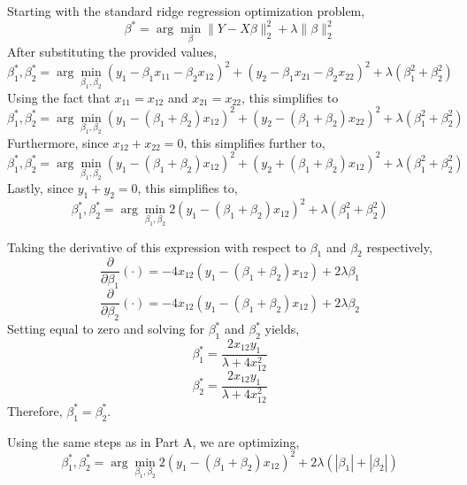 \documentclass[12pt,twoside]{article}
\begin{document}
\begin{problems}
\begin{problemparts}
\end{problemparts}

\newpage

\problem  %

\begin{problemparts}

\problempart %

Starting with the standard ridge regression optimization problem,
$$ \beta^* = \arg\min_{\beta} \lVert Y - X \beta \rVert_2^2 + \lambda \lVert 
\beta \rVert_2^2 $$
After substituting the provided values,
$$ \beta_1^*, \beta_2^* = \arg\min_{\beta_1, \beta_2} \left(y_1 - \beta_1
x_{11} - \beta_2 x_{12}\right)^2 + \left(y_2 - \beta_1 x_{21} - \beta_2
x_{22} \right)^2 + \lambda (\beta_1^2 + \beta_2^2) $$
Using the fact that $x_{11} = x_{12}$ and $x_{21} = x_{22}$, this simplifies
to
$$ \beta_1^*, \beta_2^* = \arg\min_{\beta_1, \beta_2} \left(y_1 - (\beta_1 +
\beta_2) x_{12}\right)^2 + \left(y_2 - (\beta_1 + \beta_2) x_{22} \right)^2 +
\lambda (\beta_1^2 + \beta_2^2) $$
Furthermore, since $x_{12} + x_{22} = 0$, this simplifies further to,
$$ \beta_1^*, \beta_2^* = \arg\min_{\beta_1, \beta_2} \left(y_1 - (\beta_1 +
\beta_2) x_{12}\right)^2 + \left(y_2 + (\beta_1 + \beta_2) x_{12} \right)^2 +
\lambda (\beta_1^2 + \beta_2^2) $$
Lastly, since $y_1 + y_2 = 0$, this simplifies to,
$$ \beta_1^*, \beta_2^* = \arg\min_{\beta_1, \beta_2} 2 \left(y_1 - (\beta_1
+ \beta_2) x_{12}\right)^2 + \lambda (\beta_1^2 + \beta_2^2) $$

\problempart %

Taking the derivative of this expression with respect to $\beta_1$ and
$\beta_2$ respectively,
$$ \frac{\partial}{\partial \beta_1}(\cdot) = - 4 x_{12} \left(y_1 - (\beta_1
+ \beta_2) x_{12}\right) + 2 \lambda \beta_1 $$
$$ \frac{\partial}{\partial \beta_2}(\cdot) = - 4 x_{12} \left(y_1 - (\beta_1
+ \beta_2) x_{12}\right) + 2 \lambda \beta_2 $$
Setting equal to zero and solving for $\beta_1^*$ and $\beta_2^*$ yields,
$$ \beta_1^* = \frac{2 x_{12} y_1}{\lambda + 4 x_{12}^2} $$
$$ \beta_2^* = \frac{2 x_{12} y_1}{\lambda + 4 x_{12}^2} $$
Therefore, $\beta_1^* = \beta_2^*$.

\problempart %

Using the same steps as in Part A, we are optimizing,
$$ \beta_1^*, \beta_2^* = \arg\min_{\beta_1, \beta_2} 2 \left(y_1 - (\beta_1
+ \beta_2) x_{12}\right)^2 + 2 \lambda (|\beta_1| + |\beta_2|)$$

\problempart %


\end{problemparts}
\end{problems}
\end{document}
